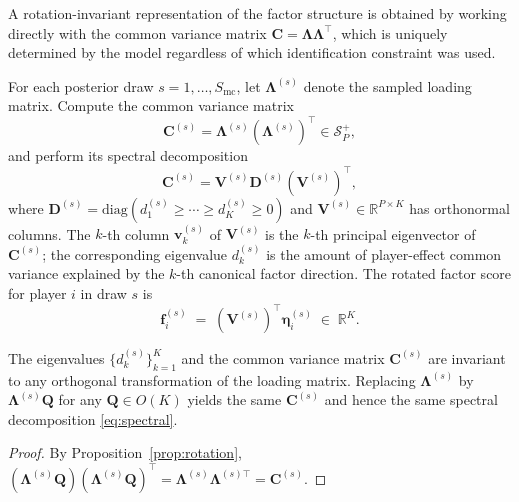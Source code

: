 A rotation-invariant representation of the factor structure is obtained by working directly with the common variance matrix $\mathbf{C} = \boldsymbol{\Lambda}\boldsymbol{\Lambda}^\top$, which is uniquely determined by the model regardless of which identification constraint was used.

\begin{definition}
\label{def:pca_postproc}
For each posterior draw $s = 1, \ldots, S_{\mathrm{mc}}$, let $\boldsymbol{\Lambda}^{(s)}$ denote the sampled loading matrix. Compute the common variance matrix
\begin{equation}
\mathbf{C}^{(s)} = \boldsymbol{\Lambda}^{(s)}\!\left(\boldsymbol{\Lambda}^{(s)}\right)^\top \in \mathcal{S}^+_P,
\label{eq:common_variance}
\end{equation}
and perform its spectral decomposition
\begin{equation}
\mathbf{C}^{(s)} = \mathbf{V}^{(s)}\mathbf{D}^{(s)}\!\left(\mathbf{V}^{(s)}\right)^\top,
\label{eq:spectral}
\end{equation}
where $\mathbf{D}^{(s)} = \mathrm{diag}\!\left(d_1^{(s)} \geq \cdots \geq d_K^{(s)} \geq 0\right)$ and $\mathbf{V}^{(s)} \in \mathbb{R}^{P \times K}$ has orthonormal columns. The $k$-th column $\mathbf{v}_k^{(s)}$ of $\mathbf{V}^{(s)}$ is the $k$-th principal eigenvector of $\mathbf{C}^{(s)}$; the corresponding eigenvalue $d_k^{(s)}$ is the amount of player-effect common variance explained by the $k$-th canonical factor direction. The rotated factor score for player $i$ in draw $s$ is
\begin{equation}
\mathbf{f}_i^{(s)} \;=\; \left(\mathbf{V}^{(s)}\right)^\top \boldsymbol{\eta}_i^{(s)} \;\in\; \mathbb{R}^K.
\label{eq:rotated_scores}
\end{equation}
\end{definition}

\begin{proposition}
\label{prop:spectral_inv}
The eigenvalues $\{d_k^{(s)}\}_{k=1}^K$ and the common variance matrix $\mathbf{C}^{(s)}$ are invariant to any orthogonal transformation of the loading matrix. Replacing $\boldsymbol{\Lambda}^{(s)}$ by $\boldsymbol{\Lambda}^{(s)}\mathbf{Q}$ for any $\mathbf{Q} \in O(K)$ yields the same $\mathbf{C}^{(s)}$ and hence the same spectral decomposition \eqref{eq:spectral}.
\end{proposition}
\begin{proof}
By Proposition~\ref{prop:rotation}, $(\boldsymbol{\Lambda}^{(s)}\mathbf{Q})(\boldsymbol{\Lambda}^{(s)}\mathbf{Q})^\top = \boldsymbol{\Lambda}^{(s)}\boldsymbol{\Lambda}^{(s)\top} = \mathbf{C}^{(s)}$.
\end{proof}

